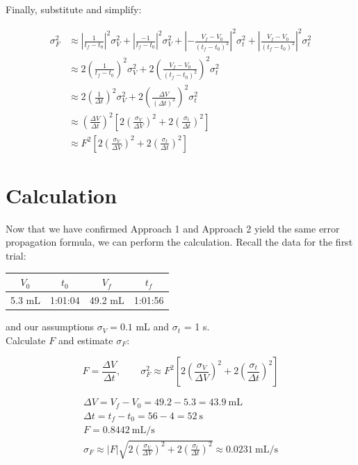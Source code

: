\documentclass[12pt,twoside]{article}
\newcommand{\fillin}[1]{{\color{white} \large #1}}
\begin{document}
Finally, substitute and simplify:

\fillin{
\begin{align*}
	\sigma_F^2 & \approx \left| \frac{1}{t_f - t_{0}} \right|^2 \sigma_V^2 
						+ \left| \frac{-1}{t_f - t_{0}} \right|^2 \sigma_V^2
						+ \left| - \frac{V_f - V_0}{(t_f - t_{0})^2} \right|^2 \sigma_t^2
						+ \left| \frac{V_f - V_{0}}{(t_f - t_{0})^2} \right|^2 \sigma_t^2 \\
			& \approx 2 \left( \frac{1}{t_f - t_{0}} \right)^2 \sigma_V^2 + 2 \left( \frac{V_f - V_{0}}{(t_f - t_{0})^2} \right)^2 \sigma_t^2 \\
			& \approx 2 \left( \frac{1}{\Delta t} \right)^2 \sigma_V^2 + 2 \left( \frac{\Delta V}{(\Delta t)^2} \right)^2 \sigma_t^2 \\
			& \approx \left(\frac{\Delta V}{\Delta t} \right)^2 \left[ 2 \left(\frac{\sigma_V}{\Delta V} \right)^2 + 2 \left(\frac{\sigma_t}{\Delta t} \right)^2 \right] \\
			& \approx F^2 \left[ 2 \left(\frac{\sigma_V}{\Delta V} \right)^2 + 2 \left(\frac{\sigma_t}{\Delta t} \right)^2 \right]
\end{align*}

\vfill \pagebreak

}

\section{Calculation}

Now that we have confirmed Approach 1 and Approach 2 yield the same error propagation formula, we can perform the calculation. Recall the data for the first trial:

\begin{center}
\begin{tabular}{c c c c}
$V_{0}$ & $t_{0}$ & $V_{f}$ & $t_{f}$ \\ \hline
5.3 mL & 1:01:04 & 49.2 mL & 1:01:56 \\	
\end{tabular}
\end{center}

and our assumptions $\sigma_V = 0.1$ mL and $\sigma_t$ = 1 s. \\

Calculate $F$ and estimate $\sigma_F$:

\begin{equation*}
	F = \frac{\Delta V}{\Delta t}, \qquad \sigma_{F}^2 \approx F^2 \left[ 2 \left(\frac{\sigma_{V}}{\Delta V} \right)^2	+ 2 \left(\frac{\sigma_{t}}{\Delta t} \right)^2 \right]
\end{equation*}

\fillin{

\begin{gather*}
\Delta V = V_f - V_0 = 49.2 - 5.3 = 43.9 \mathrm{~mL} \\
\Delta t = t_f - t_0 = 56 - 4 = 52 \mathrm{~s} \\
F = 0.8442 \mathrm{~ mL/s}	\\
\sigma_F \approx \left| F \right| \sqrt{2 \left(\frac{\sigma_{V}}{\Delta V} \right)^2	+ 2 \left(\frac{\sigma_{t}}{\Delta t} \right)^2} \approx 0.0231 \mathrm{~mL/s}
\end{gather*}

}
\end{document}
